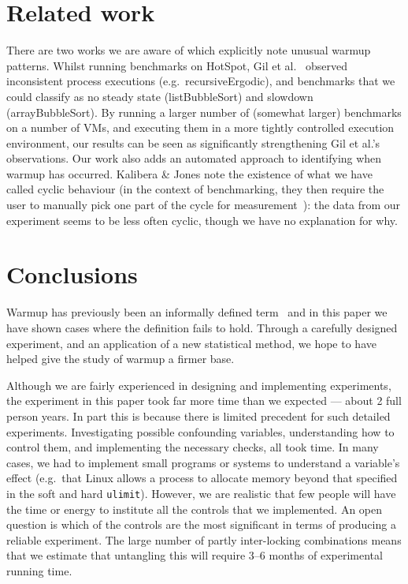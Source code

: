\documentclass[preprint,numbers,10pt]{sigplanconf}
\newcommand{\kalibera}{Kalibera \& Jones\xspace}
\begin{document}
\section{Related work}

There are two works we are aware of which explicitly note unusual warmup
patterns. Whilst running benchmarks on HotSpot, Gil et
al.~\cite{gil11microbenchmark} observed inconsistent process executions
(e.g.~recursiveErgodic), and benchmarks that we could classify as no
steady state (listBubbleSort) and slowdown (arrayBubbleSort). By running a
larger number of (somewhat larger) benchmarks on a number of VMs, and executing
them in a more tightly controlled execution environment, our results can be seen
as significantly strengthening Gil et al.'s observations. Our work also adds an
automated approach to identifying when warmup has occurred.
\kalibera note the
existence of what we have called cyclic behaviour (in the context of benchmarking,
they then require the user to
manually pick one part of the cycle for measurement~\cite{kalibera13rigorous}):
the data from our experiment seems to be less often cyclic, though we have no
explanation for why.


\section{Conclusions}
\label{sec:conclusion}

Warmup has previously been an informally defined term~\cite{seaton15phd} and in this
paper we have shown cases where the definition fails to hold. Through a carefully
designed experiment, and an application of a new statistical method, we hope
to have helped give the study of warmup a firmer base.

Although we are fairly experienced in designing and implementing
experiments, the experiment in this paper took far more time than we expected
--- about 2 full person years. In part this is because there is limited precedent for such detailed
experiments. Investigating possible confounding variables, understanding how to
control them, and implementing the necessary checks, all took time. In many
cases, we had to implement small programs or systems to understand a variable's
effect (e.g.~that Linux allows a process to allocate memory beyond that
specified in the soft and hard \texttt{ulimit}). However, we are realistic that
few people will have the time or energy to institute all the controls that we
implemented. An open question is which of the controls are the most significant
in terms of producing a reliable experiment. The large number of partly
inter-locking combinations means that we estimate that untangling this will
require 3--6 months of experimental running time.
\end{document}
